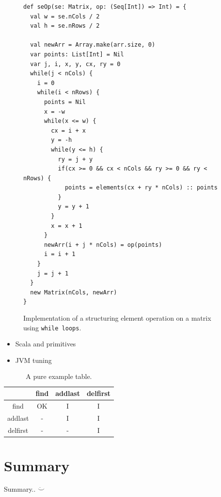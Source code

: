 \documentclass[a4paper,english]{report}
\begin{document}
\begin{figure}
  \begin{lstlisting}
def seOp(se: Matrix, op: (Seq[Int]) => Int) = {
  val w = se.nCols / 2
  val h = se.nRows / 2

  val newArr = Array.make(arr.size, 0)
  var points: List[Int] = Nil
  var j, i, x, y, cx, ry = 0
  while(j < nCols) {
    i = 0
    while(i < nRows) {
      points = Nil
      x = -w
      while(x <= w) {
        cx = i + x
        y = -h
        while(y <= h) {
          ry = j + y
          if(cx >= 0 && cx < nCols && ry >= 0 && ry < nRows) {
            points = elements(cx + ry * nCols) :: points
          }
          y = y + 1
        }
        x = x + 1
      }
      newArr(i + j * nCols) = op(points)
      i = i + 1
    }
    j = j + 1
  }
  new Matrix(nCols, newArr)
}
  \end{lstlisting}
  \caption{Implementation of a structuring element operation on a
    matrix using \texttt{while loops}.\label{fig:whileloop}}
\end{figure}

\begin{itemize}
  \item Scala and primitives
  \item JVM tuning
\end{itemize}

\begin{table}[ht]
  \centering
  \begin{tabular}{c c c c}
    \hline\hline
    & find & addlast & delfirst \\ [0.5ex]
    \hline\hline
    find & OK & I & I \\
    addlast & - & I & I \\
    delfirst & - & - & I \\
    \hline\hline
  \end{tabular}
  \caption{A pure example table.\label{tab:ex1}}
\end{table}

\chapter{Summary}

Summary.. $\ddot\smile$



\end{document}
